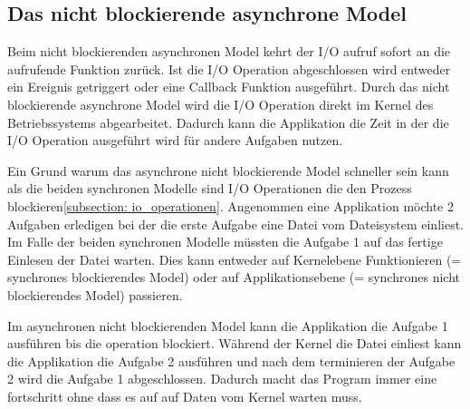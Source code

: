 \subsection{Das nicht blockierende asynchrone Model}
Beim nicht blockierenden asynchronen Model kehrt der I/O aufruf sofort an die aufrufende Funktion zurück. Ist die I/O Operation abgeschlossen wird entweder ein Ereignis getriggert oder eine Callback Funktion ausgeführt. Durch das nicht blockierende asynchrone Model wird die I/O Operation direkt im Kernel des Betriebssystems abgearbeitet. Dadurch kann die Applikation die Zeit in der die I/O Operation ausgeführt wird für andere Aufgaben nutzen.

Ein Grund warum das asynchrone nicht blockierende Model schneller sein kann als die beiden synchronen Modelle sind I/O Operationen die den Prozess blockieren\ref{subsection: io_operationen}. Angenommen eine Applikation möchte 2 Aufgaben erledigen bei der die erste Aufgabe eine Datei vom Dateisystem einliest. Im Falle der beiden synchronen Modelle müssten die Aufgabe 1 auf das fertige Einlesen der Datei warten. Dies kann entweder auf Kernelebene Funktionieren (= synchrones blockierendes Model) oder auf Applikationsebene (= synchrones nicht blockierendes Model) passieren. 

Im asynchronen nicht blockierenden Model kann die Applikation die Aufgabe 1 ausführen bis die operation blockiert. Während der Kernel die Datei einliest kann die Applikation die Aufgabe 2 ausführen und nach dem terminieren der Aufgabe 2 wird die Aufgabe 1 abgeschlossen. Dadurch macht das Program immer eine fortschritt ohne dass es auf auf Daten vom Kernel warten muss.